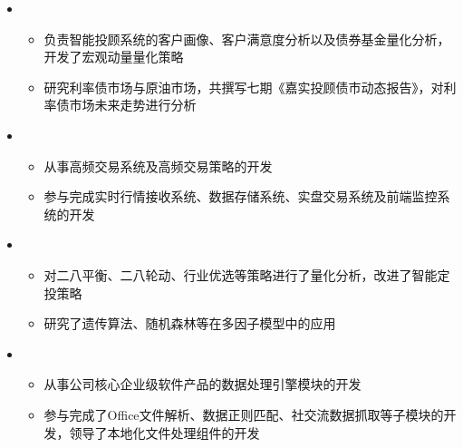   \begin{itemize}[leftmargin=*]
    \item
      {\small
      \begin{itemize}
        \item 负责智能投顾系统的客户画像、客户满意度分析以及债券基金量化分析，开发了宏观动量量化策略
        \item 研究利率债市场与原油市场，共撰写七期《嘉实投顾债市动态报告》，对利率债市场未来走势进行分析
      \end{itemize}
      }
    \item
      {\small
      \begin{itemize}
        \item 从事高频交易系统及高频交易策略的开发
        \item 参与完成实时行情接收系统、数据存储系统、实盘交易系统及前端监控系统的开发
      \end{itemize}
      }
    \item
      {\small
      \begin{itemize}
        \item 对二八平衡、二八轮动、行业优选等策略进行了量化分析，改进了智能定投策略
        \item 研究了遗传算法、随机森林等在多因子模型中的应用
      \end{itemize}
      }
    \item
      {\small
      \begin{itemize}
        \item 从事公司核心企业级软件产品的数据处理引擎模块的开发
        \item 参与完成了Office文件解析、数据正则匹配、社交流数据抓取等子模块的开发，领导了本地化文件处理组件的开发
      \end{itemize}
      }
  \end{itemize}